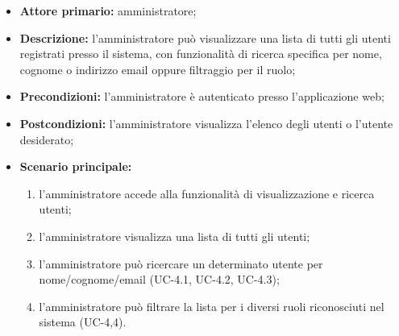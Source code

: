 \begin{itemize}
	\item \textbf{Attore primario:} amministratore; 

	\item \textbf{Descrizione:} l'amministratore può visualizzare una lista di tutti gli utenti registrati presso il sistema, con funzionalità di ricerca specifica per nome, cognome o indirizzo email oppure filtraggio per il ruolo;

	\item \textbf{Precondizioni:} l'amministratore è autenticato presso l'applicazione web;

	\item \textbf{Postcondizioni:} l'amministratore visualizza l'elenco degli utenti o l'utente desiderato;

	\item \textbf{Scenario principale:}
	      \begin{enumerate}
		      \item l'amministratore accede alla funzionalità di visualizzazione e ricerca utenti;
		      \item l'amministratore visualizza una lista di tutti gli utenti;
		      \item l'amministratore può ricercare un determinato utente per nome/cognome/email (UC-4.1, UC-4.2, UC-4.3);
		      \item l'amministratore può filtrare la lista per i diversi ruoli riconosciuti nel sistema (UC-4,4).
	      \end{enumerate}
\end{itemize}

